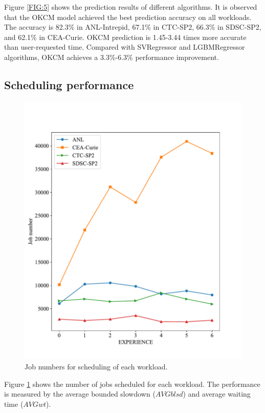 \documentclass[a4paper,fleqn]{cas-sc}
\begin{document}
Figure \ref{FIG:5} shows the prediction results of different algorithms. It is observed that the OKCM model achieved the best prediction accuracy on all workloads. The accuracy is 82.3\% in ANL-Intrepid, 67.1\% in CTC-SP2, 66.3\% in SDSC-SP2, and 62.1\% in CEA-Curie. OKCM prediction is 1.45-3.44 times more accurate than user-requested time. Compared with SVRegressor and LGBMRegressor algorithms, OKCM achieves a 3.3\%-6.3\% performance improvement.

\subsection{Scheduling performance}
\begin{figure}
	\centering
	\includegraphics[scale=.43]{figs/Fig6.pdf}
	\caption{Job numbers for scheduling of each workload.}
	\label{FIG:6}
\end{figure}
Figure \ref{FIG:6} shows the number of jobs scheduled for each workload. The performance is measured by the average bounded slowdown ($A\!V\!Gblsd$) and average waiting time ($A\!V\!Gwt$).
\end{document}

